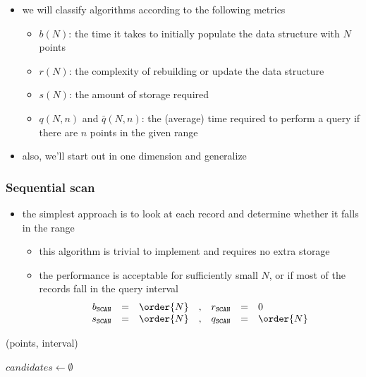 \begin{frame}[fragile]
\begin{itemize}
%
  \item we will classify algorithms according to the following metrics
    \begin{itemize}
    \item $b(N)$: the time it takes to initially populate the data structure with $N$ points
    \item $r(N)$: the complexity of rebuilding or update the data structure
    \item $s(N)$: the amount of storage required
    \item $q(N,n)$ and $\bar{q}(N,n)$: the (average) time required to perform a query if
      there are $n$ points in the given range
    \end{itemize}
%
  \item also, we'll start out in one dimension and generalize
%
  \end{itemize}
%
\end{frame}

\begin{frame}[fragile]
%
  \frametitle{Sequential scan}
%
  \begin{itemize}
%
  \item the simplest approach is to look at each record and determine whether it falls in the
    range
    \begin{itemize}
    \item this algorithm is trivial to implement and requires no extra storage
    \item the performance is acceptable for sufficiently small $N$, or if most of the records
      fall in the query interval
      \begin{equation*}
        \begin{array}{rclcrcl}
          b_{{\tt SCAN}} & = & \order{N} &, &
          r_{{\tt SCAN}} & = & 0  \\
          s_{{\tt SCAN}} & = & \order{N} &, &
          q_{{\tt SCAN}} & = & \order{N}
        \end{array}
      \end{equation*}
    \end{itemize}
%
  \end{itemize}
%
  \begin{center}
    \begin{minipage}{.85\linewidth}
      \begin{algorithm}[H]
        \label{alg:rq-scan}
%
        \DontPrintSemicolon
        \SetAlCapHSkip{0ex}
%
        \caption{\rqscan(points, interval)}
%
        $candidates \leftarrow \emptyset$ \;
%
      \end{algorithm}
    \end{minipage}
  \end{center}
%
\end{frame}

